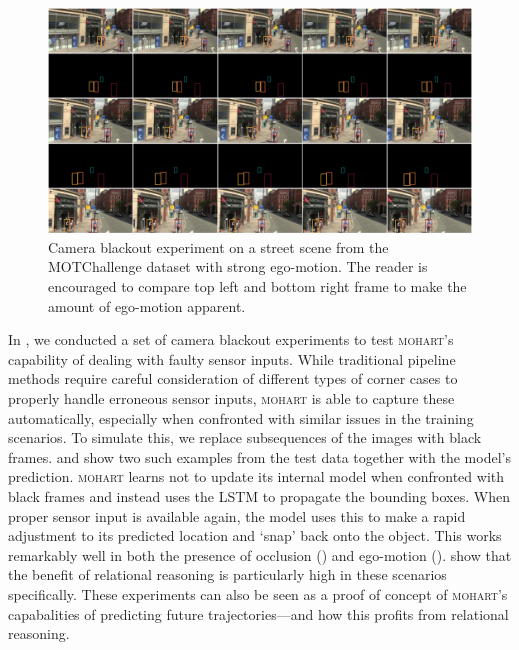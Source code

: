 \begin{figure}
	\centering
	\includegraphics[width=1.0\textwidth]{figures/MOHART/mot_example2.png}
	\caption{Camera blackout experiment on a street scene from the MOTChallenge dataset with strong ego-motion. The reader is encouraged to compare top left and bottom right frame to make the amount of ego-motion apparent.}
	\label{fig:blackout2}
\end{figure}


In , we conducted a set of camera blackout experiments to test \textsc{mohart}'s capability of dealing with faulty sensor inputs. While traditional pipeline methods require careful consideration of different types of corner cases to properly handle erroneous sensor inputs, \textsc{mohart} is able to capture these automatically, especially when confronted with similar issues in the training scenarios. To simulate this, we replace subsequences of the images with black frames.  and  show two such examples from the test data together with the model's prediction. \textsc{mohart} learns not to update its internal model when confronted with black frames and instead uses the LSTM to propagate the bounding boxes. When proper sensor input is available again, the model uses this to make a rapid adjustment to its predicted location and `snap' back onto the object. This works remarkably well in both the presence of occlusion () and ego-motion ().  show that the benefit of relational reasoning is particularly high in these scenarios specifically. These experiments can also be seen as a proof of concept of \textsc{mohart}'s capabalities of predicting future trajectories---and how this profits from relational reasoning.